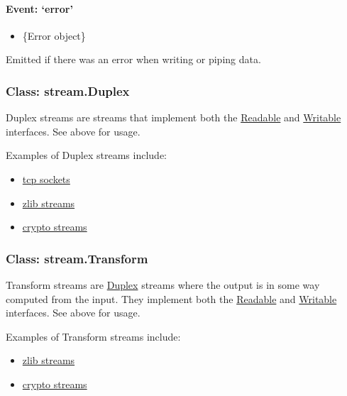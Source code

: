 \paragraph{\texorpdfstring{Event:
`error'}{Event: error}}\label{event-error-1}

\begin{itemize}
\itemsep1pt\parskip0pt
\item
  \{Error object\}
\end{itemize}

Emitted if there was an error when writing or piping data.

\subsubsection{Class: stream.Duplex}\label{class-stream.duplex}

Duplex streams are streams that implement both the
\hyperref[streamux5fclassux5fstreamux5freadable]{Readable} and
\hyperref[streamux5fclassux5fstreamux5fwritable]{Writable} interfaces.
See above for usage.

Examples of Duplex streams include:

\begin{itemize}
\itemsep1pt\parskip0pt
\item
  \href{net.html\#net_class_net_socket}{tcp sockets}
\item
  \href{zlib.html}{zlib streams}
\item
  \href{crypto.html}{crypto streams}
\end{itemize}

\subsubsection{Class: stream.Transform}\label{class-stream.transform}

Transform streams are
\hyperref[streamux5fclassux5fstreamux5fduplex]{Duplex} streams where the
output is in some way computed from the input. They implement both the
\hyperref[streamux5fclassux5fstreamux5freadable]{Readable} and
\hyperref[streamux5fclassux5fstreamux5fwritable]{Writable} interfaces.
See above for usage.

Examples of Transform streams include:

\begin{itemize}
\itemsep1pt\parskip0pt
\item
  \href{zlib.html}{zlib streams}
\item
  \href{crypto.html}{crypto streams}
\end{itemize}

